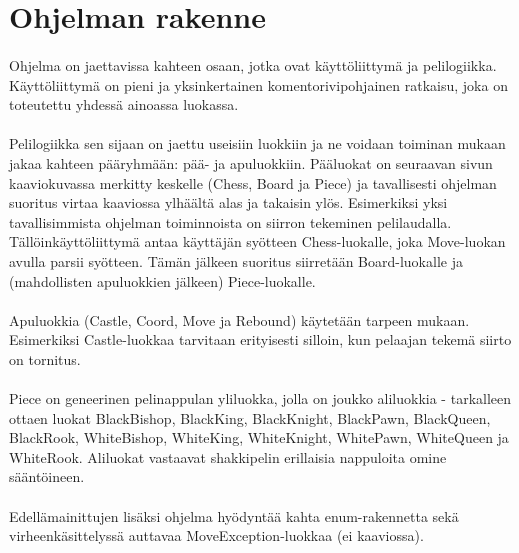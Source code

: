 \documentclass[12pt]{article}
\begin{document}
\section{Ohjelman rakenne}

\paragraph{} Ohjelma on jaettavissa kahteen osaan, jotka ovat käyttöliittymä ja pelilogiikka. Käyttöliittymä on pieni ja yksinkertainen komentorivipohjainen ratkaisu, joka on toteutettu yhdessä ainoassa luokassa.

\paragraph{} Pelilogiikka sen sijaan on jaettu useisiin luokkiin ja ne voidaan toiminan mukaan jakaa kahteen pääryhmään: pää- ja apuluokkiin. Pääluokat on seuraavan sivun kaaviokuvassa merkitty keskelle (Chess, Board ja Piece) ja tavallisesti ohjelman suoritus virtaa kaaviossa ylhäältä alas ja takaisin ylös. Esimerkiksi yksi tavallisimmista ohjelman toiminnoista on siirron tekeminen pelilaudalla. Tällöinkäyttöliittymä antaa käyttäjän syötteen Chess-luokalle, joka Move-luokan avulla parsii syötteen. Tämän jälkeen suoritus siirretään Board-luokalle ja (mahdollisten apuluokkien jälkeen) Piece-luokalle.

\paragraph{} Apuluokkia (Castle, Coord, Move ja Rebound) käytetään tarpeen mukaan. Esimerkiksi Castle-luokkaa tarvitaan erityisesti silloin, kun pelaajan tekemä siirto on tornitus.

\paragraph{} Piece on geneerinen pelinappulan yliluokka, jolla on joukko aliluokkia - tarkalleen ottaen luokat BlackBishop, BlackKing, BlackKnight, BlackPawn, BlackQueen, BlackRook, WhiteBishop, WhiteKing, WhiteKnight, WhitePawn, WhiteQueen ja WhiteRook. Aliluokat vastaavat shakkipelin erillaisia nappuloita omine sääntöineen.

\paragraph{} Edellämainittujen lisäksi ohjelma hyödyntää kahta enum-rakennetta sekä virheenkäsittelyssä auttavaa MoveException-luokkaa (ei kaaviossa).
\end{document}
